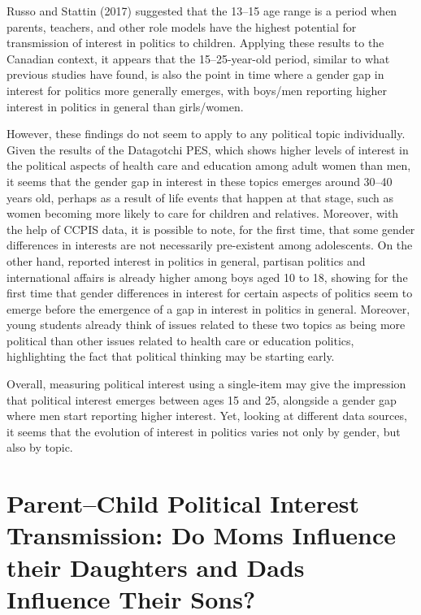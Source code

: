 \documentclass[
  letterpaper,
  DIV=11,
  numbers=noendperiod]{scrreprt}
\begin{document}
Russo and Stattin (2017) suggested that the 13--15 age range is a period
when parents, teachers, and other role models have the highest potential
for transmission of interest in politics to children. Applying these
results to the Canadian context, it appears that the 15--25-year-old
period, similar to what previous studies have found, is also the point
in time where a gender gap in interest for politics more generally
emerges, with boys/men reporting higher interest in politics in general
than girls/women.

However, these findings do not seem to apply to any political topic
individually. Given the results of the Datagotchi PES, which shows
higher levels of interest in the political aspects of health care and
education among adult women than men, it seems that the gender gap in
interest in these topics emerges around 30--40 years old, perhaps as a
result of life events that happen at that stage, such as women becoming
more likely to care for children and relatives. Moreover, with the help
of CCPIS data, it is possible to note, for the first time, that some
gender differences in interests are not necessarily pre-existent among
adolescents. On the other hand, reported interest in politics in
general, partisan politics and international affairs is already higher
among boys aged 10 to 18, showing for the first time that gender
differences in interest for certain aspects of politics seem to emerge
before the emergence of a gap in interest in politics in general.
Moreover, young students already think of issues related to these two
topics as being more political than other issues related to health care
or education politics, highlighting the fact that political thinking may
be starting early.

Overall, measuring political interest using a single-item may give the
impression that political interest emerges between ages 15 and 25,
alongside a gender gap where men start reporting higher interest. Yet,
looking at different data sources, it seems that the evolution of
interest in politics varies not only by gender, but also by topic.


\chapter{Parent--Child Political Interest Transmission: Do Moms
Influence their Daughters and Dads Influence Their
Sons?}\label{sec-chap4}
\end{document}
